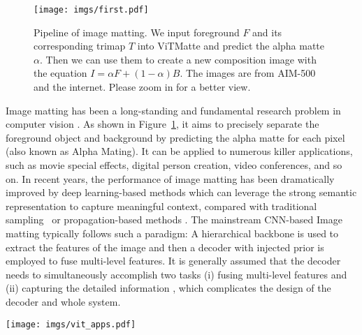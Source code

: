 \documentclass[10pt,twocolumn,letterpaper]{article}
\newcommand{\thename}{ViTMatte}
\begin{document}
\begin{figure}
    \centering
    \texttt{[image: imgs/first.pdf]}
    \caption{Pipeline of image matting. We input foreground $F$ and its corresponding trimap $T$ into \thename{} and predict the alpha matte $\alpha$. Then we can use them to create a new composition image with the equation $I=\alpha F+(1-\alpha)B$. The images are from AIM-500~\cite{aim500} and the internet. Please zoom in for a better view.}
    \label{fig:first}
\end{figure}

Image matting has been a long-standing and fundamental research problem in computer vision \cite{closed-form, matting_survey}. As shown in Figure~\ref{fig:first}, it aims to precisely separate the foreground object and background by predicting the alpha matte for each pixel (also known as Alpha Mating). It can be applied to numerous killer applications, such as movie special effects, digital person creation, video conferences, and so on. In recent years, the performance of image matting has been dramatically improved by deep learning-based methods \cite{DIM, sim, MGM, Tripartitle2021} which can leverage the strong semantic representation to capture meaningful context, compared with traditional sampling~\cite{matting2013, hematting2011} or propagation-based methods \cite{poissonmatting04, nonlocalmatting2011, knnmatting2013}. The mainstream CNN-based Image matting typically follows such a paradigm: A hierarchical backbone is used to extract the features of the image and then a decoder with injected prior is employed to fuse multi-level features. It is generally assumed that the decoder needs to simultaneously accomplish two tasks (i) fusing multi-level features and (ii) capturing the detailed information \cite{HAttMatting, GCAMatting,MGM}, which complicates the design of the decoder and whole system.

\begin{figure*}
    \centering
    \texttt{[image: imgs/vit\_apps.pdf]}
    \caption{Overview of \thename{} and other applications of plain vision transformers~\cite{vitdet, vitpose, vitrs}. They use a simple feature pyramid designed by ViTDet~\cite{vitdet}. Differently, we propose a new adaptation strategy, especially for image matting, named \thename{}. We use simple convolution layers to get detailed information about the image and the feature map output by plain vision transformers is used only once.}
    \label{fig:vit_apps}
\end{figure*}
\end{document}
